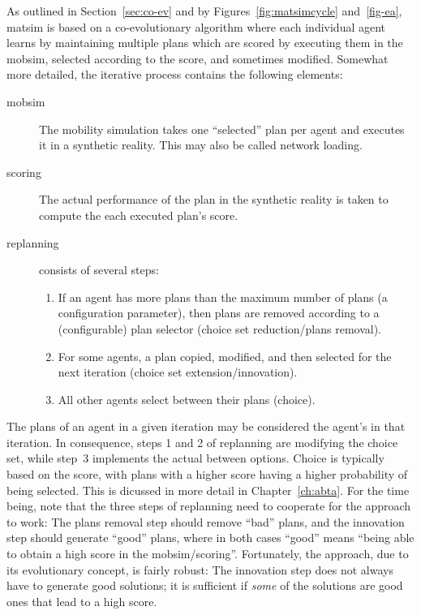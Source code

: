 As outlined in Section~\ref{sec:co-ev} and by Figures~\ref{fig:matsimcycle} and~\ref{fig-ea}, \gls{matsim} is based on a co-evolutionary algorithm where each individual agent learns by maintaining multiple plans which are scored by executing them in the mobsim, selected according to the score, and sometimes modified.  Somewhat more detailed, the iterative process contains the following elements:
\begin{description}

\item[mobsim] The mobility simulation takes one ``selected'' plan per agent and executes it in a synthetic reality.  This may also be called network loading.

\item [scoring] The actual performance of the plan in the synthetic reality is taken to compute the each executed plan's score.

\item [replanning] consists of several steps:
  \begin{enumerate}

  \item If an agent has more plans than the maximum number of plans (a configuration parameter), then plans are removed according to a (configurable) plan selector (choice set reduction/plans removal).

    \item For some agents, a plan copied, modified, and then selected for the next iteration (choice set extension/innovation).

  \item All other agents select between their plans (choice).

  \end{enumerate}

\end{description}

The plans of an agent in a given iteration may be considered the agent's  in that iteration.  In consequence, steps 1 and 2 of replanning are modifying the choice set, while step~3 implements the actual  between options.
%
Choice is typically based on the score, with plans with a higher score having a higher probability of being selected.  
%
This is dicussed in more detail in Chapter~\ref{ch:abta}.  For the time being, note that the three steps of replanning need to cooperate for the approach to work: The plans removal step should remove ``bad'' plans, and the innovation step should generate ``good'' plans, where in both cases ``good'' means ``being able to obtain a high score in the mobsim/scoring''.  Fortunately, the approach, due to its evolutionary concept, is fairly robust: The innovation step does not always have to generate good solutions; it is sufficient if \emph{some} of the solutions are good ones that lead to a high score.

